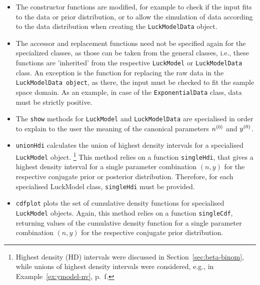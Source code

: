 \begin{itemize}
\item The constructor functions are modified, for example to check if the input
   fits to the data or prior distribution, or to allow the simulation of data
   according to the data distribution when creating the \texttt{LuckModelData} object.
\item The accessor and replacement functions need not be specified again for the
   specialized classes, as those can be taken from the general classes, i.e.,
   these functions are 'inherited' from the respective \texttt{LuckModel} or \texttt{LuckModelData}
   class. An exception is the function for replacing the raw data in the
   \texttt{LuckModelData object}, as there, the input must be checked to fit the sample
   space domain. As an example, in case of the \texttt{ExponentialData} class, data must be
   strictly positive.
\item The \texttt{show} methods for \texttt{LuckModel} and \texttt{LuckModelData} are specialised in order
   to explain to the user the meaning of the canonical parameters $n^{(0)}$ and $y^{(0)}$.
\item \texttt{unionHdi} calculates the union of highest density intervals for a
   specialised \texttt{LuckModel} object.%
   \footnote{Highest density (HD) intervals were discussed in Section~\ref{sec:beta-binom},
   while unions of highest density intervals were considered, e.g.,
   in Example~\ref{ex:ymodel-nv}, p.~\pageref{ex:ymodel-nv}f.}
   This method relies on a function \texttt{singleHdi},
   that gives a highest density interval for a single parameter combination
   $(n, y)$ for the respective conjugate prior or posterior distribution.
   Therefore, for each specialised LuckModel class, \texttt{singleHdi} must be
   provided.
\item \texttt{cdfplot} plots the set of cumulative density functions for specialised
   \texttt{LuckModel} objects. Again, this method relies on a function \texttt{singleCdf},
   returning values of the cumulative density function for a single parameter combination $(n, y)$
   for the respective conjugate prior distribution.
\end{itemize}











